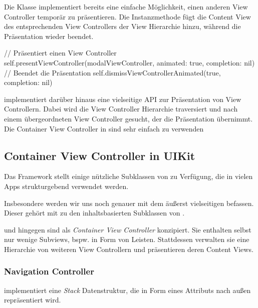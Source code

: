 \documentclass[parskip=half, final]{scrreprt}
\begin{document}
Die  Klasse implementiert bereits eine einfache Möglichkeit, einen anderen View Controller temporär zu präsentieren. Die Instanzmethode  fügt die Content View des entsprechenden View Controllers der View Hierarchie hinzu, während  die Präsentation wieder beendet.

\begin{swiftcode}
// Präsentiert einen View Controller
self.presentViewController(modalViewController, animated: true, completion: nil)
// Beendet die Präsentation
self.dismissViewControllerAnimated(true, completion: nil)
\end{swiftcode}

 implementiert darüber hinaus eine vielseitige API zur Präsentation von View Controllern. Dabei wird die View Controller Hierarchie traversiert und nach einem übergeordneten View Controller gesucht, der die Präsentation übernimmt. Die Container View Controller in  sind sehr einfach zu verwenden 

\subsection{Container View Controller in UIKit}\label{sec:vc_container_uikit}

Das  Framework stellt einige nützliche Subklassen von  zu Verfügung, die in vielen Apps strukturgebend verwendet werden.

Insbesondere werden wir uns noch genauer mit dem äußerst vielseitigen  befassen. Dieser gehört mit  zu den inhaltsbasierten Subklassen von .

 und  hingegen sind als \emph{Container View Controller} konzipiert. Sie enthalten selbst nur wenige Subviews, bspw. in Form von Leisten. Stattdessen verwalten sie eine Hierarchie von weiteren View Controllern und präsentieren deren Content Views.

\subsubsection{Navigation Controller}

 implementiert eine \emph{Stack} Datenstruktur, die in Form eines Attributs  nach außen repräsentiert wird.
\end{document}
